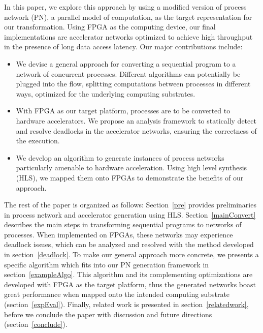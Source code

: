 \documentclass{sig-alternate}
\begin{document}
In this paper, we explore this approach by using a modified version of process network (PN), a parallel model of computation, as the target representation for our transformation.
Using FPGA as the computing device, our final implementations are accelerator networks optimized to achieve high throughput in the presence of long data access latency.
Our major contributions include:
\begin{itemize}
    \item We devise a general approach for converting a sequential program to a network
of concurrent processes. Different algorithms can potentially be plugged into the flow, splitting computations between processes in different ways, optimized for the underlying computing substrates.
    \item With FPGA as our target platform, processes are to be converted to hardware accelerators. We
    propose an analysis framework to statically detect and resolve deadlocks in the accelerator networks, ensuring the correctness of the execution. 
    \item We develop an algorithm to generate instances of process networks
particularly amenable to hardware acceleration. Using high level synthesis (HLS), we mapped them onto FPGAs
to demonstrate the benefits of our approach. 
\end{itemize}

The rest of the paper is organized as follows:
Section~\ref{pre} provides preliminaries in process network
and accelerator generation using HLS. Section~\ref{mainConvert} describes the main steps in transforming sequential programs
to networks of processes. When implemented on FPGAs, these networks may experience deadlock issues, which can be analyzed and resolved with the method developed in section~\ref{deadlock}. To make our general approach more concrete, we presents a specific algorithm which fits into our PN generation framework in section~\ref{exampleAlgo}.
This algorithm and its complementing optimizations are developed with FPGA as the target platform, thus the generated networks boast great performance when mapped onto the intended 
computing substrate (section~\ref{expEval}). Finally, related work is presented in section~\ref{relatedwork}, before we conclude the paper with discussion and future directions (section~\ref{conclude}).
\end{document}
